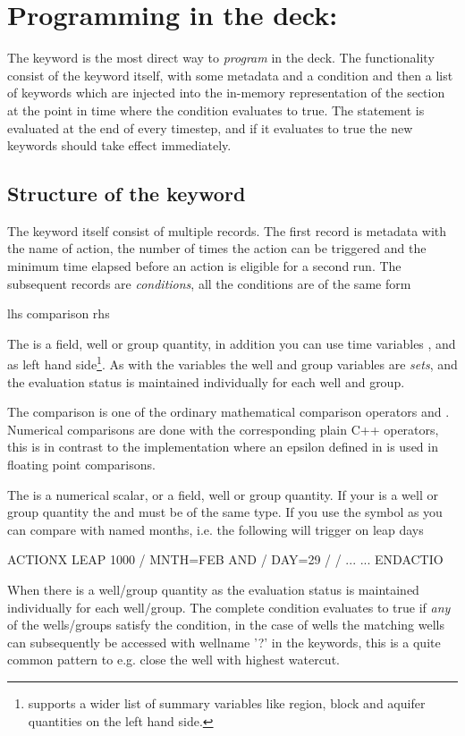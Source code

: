 \newcommand{\actionx}{}
\chapter{Programming in the deck: \actionx}
\label{actionx}
The \actionx{} keyword is the most direct way to \emph{program} in the deck. The
\actionx{} functionality consist of the \actionx{} keyword itself, with some
metadata and a condition and then a list of keywords which are injected into the
in-memory representation of the  section at the point in time where
the condition evaluates to true. The \actionx{} statement is evaluated at the
end of every timestep, and if it evaluates to true the new keywords should take
effect immediately.

\section{Structure of the \actionx{} keyword}
The \actionx{} keyword itself consist of multiple records. The first record is
metadata with the name of action, the number of times the action can be
triggered and the minimum time elapsed before an action is eligible for a second
run. The subsequent records are \emph{conditions}, all the conditions are of the
same form
\begin{code}
  lhs comparison rhs
\end{code}
The  is a field, well or group quantity, in addition you can
use time variables ,  and  as left hand
side\footnote{\eclipse{} supports a wider list of summary variables like region,
block and aquifer quantities on the left hand side.}. As with the \udq{}
variables the well and group variables are \emph{sets}, and the evaluation
status is maintained individually for each well and group.

The comparison is one of the ordinary mathematical comparison operators
\inlinecode{>,<,=,!=, <=} and \inlinecode{>=}. Numerical comparisons are done
with the corresponding plain C++ operators, this is in contrast to the \udq{}
implementation where an epsilon defined in  is used in floating
point comparisons.

The  is a numerical scalar, or a field, well or group quantity.
If your  is a well or group quantity the  and
 must be of the same type. If you use the symbol  as
 you can compare with named months, i.e. the following will
trigger on leap days
\begin{deck}
ACTIONX
  LEAP 1000 /
  MNTH=FEB AND /
  DAY=29 /
/
...
...
ENDACTIO
\end{deck}
When there is a well/group quantity as  the evaluation status is
maintained individually for each well/group. The complete condition evaluates to
true if \emph{any} of the wells/groups satisfy the condition, in the case of
wells the matching wells can subsequently be accessed with wellname '?' in the
 keywords, this is a quite common pattern to e.g. close the well
with highest watercut.

